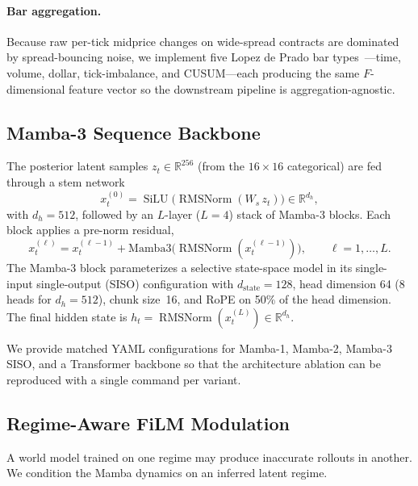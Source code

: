 \documentclass{article}
\newcommand{\R}{\mathbb{R}}
\newcommand{\zt}{z_t}
\newcommand{\hstate}{h_t}
\DeclareMathOperator{\SiLU}{SiLU}
\DeclareMathOperator{\RMSNorm}{RMSNorm}
\begin{document}
\paragraph{Bar aggregation.}
Because raw per-tick midprice changes on wide-spread contracts are
dominated by spread-bouncing noise, we implement five Lopez de Prado bar
types~\citep{deprado2018advances}---time, volume, dollar,
tick-imbalance, and CUSUM---each producing the same $F$-dimensional
feature vector so the downstream pipeline is aggregation-agnostic.

\subsection{Mamba-3 Sequence Backbone}\label{sec:mamba3}

The posterior latent samples $\zt \in \R^{256}$ (from the
$16\!\times\!16$ categorical) are fed through a stem network
\begin{equation}
  x_t^{(0)} = \SiLU\!\bigl(\RMSNorm(W_s\,\zt)\bigr) \in \R^{d_h},
\end{equation}
with $d_h = 512$, followed by an $L$-layer ($L = 4$) stack of Mamba-3
blocks.  Each block applies a pre-norm residual,
\begin{equation}\label{eq:mamba_block}
  x_t^{(\ell)} = x_t^{(\ell-1)} + \mathrm{Mamba3}\!\bigl(
  \RMSNorm(x_t^{(\ell-1)})\bigr),
  \qquad \ell = 1, \ldots, L.
\end{equation}
The Mamba-3 block parameterizes a selective state-space model in its
single-input single-output (SISO) configuration with
$d_{\text{state}} = 128$, head dimension 64 (8 heads for $d_h = 512$),
chunk size~16, and RoPE on 50\% of the head dimension.  The
final hidden state is $\hstate = \RMSNorm(x_t^{(L)}) \in \R^{d_h}$.

We provide matched YAML
configurations for Mamba-1, Mamba-2, Mamba-3 SISO, and a Transformer
backbone so that the architecture ablation can be reproduced with a
single command per variant.

\subsection{Regime-Aware FiLM Modulation}\label{sec:regime_film}

A world model trained on one regime may produce inaccurate rollouts in
another.  We condition the Mamba dynamics on an inferred latent regime.
\end{document}
